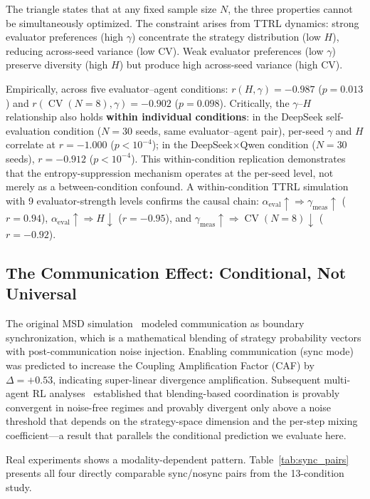 \documentclass[11pt]{article}
\DeclareMathOperator{\CV}{CV}
\begin{document}
The triangle states that at any fixed sample size $N$, the three properties cannot be simultaneously optimized. The constraint arises from TTRL dynamics: strong evaluator preferences (high $\gamma$) concentrate the strategy distribution (low $H$), reducing across-seed variance (low CV). Weak evaluator preferences (low $\gamma$) preserve diversity (high $H$) but produce high across-seed variance (high CV).

Empirically, across five evaluator--agent conditions: $r(H, \gamma) = -0.987$ ($p = 0.013$) and $r(\CV(N{=}8), \gamma) = -0.902$ ($p = 0.098$). Critically, the $\gamma$--$H$ relationship also holds \textbf{within individual conditions}: in the DeepSeek self-evaluation condition ($N{=}30$ seeds, same evaluator--agent pair), per-seed $\gamma$ and $H$ correlate at $r = -1.000$ ($p < 10^{-4}$); in the DeepSeek$\times$Qwen condition ($N{=}30$ seeds), $r = -0.912$ ($p < 10^{-4}$). This within-condition replication demonstrates that the entropy-suppression mechanism operates at the per-seed level, not merely as a between-condition confound. A within-condition TTRL simulation with 9 evaluator-strength levels confirms the causal chain: $\alpha_{\text{eval}} \uparrow \Rightarrow \gamma_{\text{meas}} \uparrow$ ($r = 0.94$), $\alpha_{\text{eval}} \uparrow \Rightarrow H \downarrow$ ($r = -0.95$), and $\gamma_{\text{meas}} \uparrow \Rightarrow \CV(N{=}8) \downarrow$ ($r = -0.92$).

\subsection{The Communication Effect: Conditional, Not Universal}

The original MSD simulation~\cite{liu2026mmepc} modeled communication as boundary synchronization, which is a mathematical blending of strategy probability vectors with post-communication noise injection. Enabling communication (sync mode) was predicted to increase the Coupling Amplification Factor (CAF) by $\Delta = +0.53$, indicating super-linear divergence amplification. Subsequent multi-agent RL analyses~\cite{kapetanakis2014balanced,foerster2016learning} established that blending-based coordination is provably convergent in noise-free regimes and provably divergent only above a noise threshold that depends on the strategy-space dimension and the per-step mixing coefficient---a result that parallels the conditional prediction we evaluate here.

Real experiments shows a modality-dependent pattern. Table~\ref{tab:sync_pairs} presents all four directly comparable sync/nosync pairs from the 13-condition study.
\end{document}
